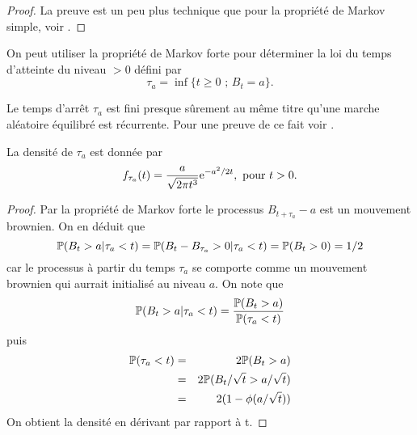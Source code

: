 \begin{proof}
La preuve est un peu plus technique que pour la propriété de Markov simple, voir \citet[Theoreme 2.3]{Gall2012}.
\end{proof}
On peut utiliser la propriété de Markov forte pour déterminer la loi du temps d'atteinte du niveau $>0$ défini par 
$$
\tau_a = \inf\{t\geq 0\text{ ; }B_t  = a\}.
$$
\begin{remark}
Le temps d'arrêt $\tau_a$ est fini presque sûrement au même titre qu'une marche aléatoire équilibré est récurrente. Pour une preuve de ce fait voir \citet[Corollaire 2.3]{Gall2012}.
\end{remark}
\begin{prop}
La densité de $\tau_a$ est donnée par 
$$
f_{\tau_a}(t)=\frac{a}{\sqrt{2\pi t^3}}\mathrm{e}^{-a^2/2t},\text{ pour }t>0.
$$
\end{prop}
\begin{proof}
Par la propriété de Markov forte le processus $B_{t+\tau_a}-a$ est un mouvement brownien. On en déduit que 
$$
\mathbb{P}(B_t > a | \tau_a < t) = \mathbb{P}(B_t - B_{\tau_a} > 0 | \tau_a < t) =\mathbb{P}(B_t >0) = 1/2
$$
car le processus à partir du temps $\tau_a$ se comporte comme un mouvement brownien qui aurrait initialisé au niveau $a$. On note que 
$$
\mathbb{P}(B_t > a | \tau_a < t) = \frac{\mathbb{P}(B_t>a)}{\mathbb{P}(\tau_a <t)}
$$
puis
\begin{eqnarray*}
\mathbb{P}(\tau_a <t) &=&2\mathbb{P}(B_t>a)\\
 &=&2\mathbb{P}(B_t / \sqrt{t} >a/\sqrt{t})\\
 &=&2(1-\phi(a/\sqrt{t}))
\end{eqnarray*}
On obtient la densité en dérivant par rapport à t.
\end{proof}

